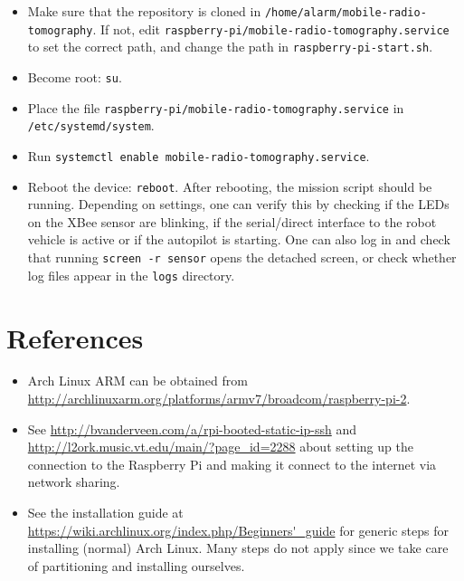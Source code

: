 \documentclass{article}
\begin{document}
\begin{itemize}
    \item Make sure that the repository is cloned in
          {\tt /home/alarm/mobile-radio-tomography}. If not, edit
          {\tt raspberry-pi/mobile-radio-tomography.service} to set the
          correct path, and change the path in {\tt raspberry-pi-start.sh}.
    \item Become root: {\tt su}.
    \item Place the file {\tt raspberry-pi/mobile-radio-tomography.service} in
          {\tt /etc/systemd/system}.
    \item Run {\tt systemctl enable mobile-radio-tomography.service}.
    \item Reboot the device: {\tt reboot}. After rebooting, the mission script 
          should be running. Depending on settings, one can verify this by 
          checking if the LEDs on the XBee sensor are blinking, if the 
          serial/direct interface to the robot vehicle is active or if the 
          autopilot is starting. One can also log in and check that running 
          {\tt screen -r sensor} opens the detached screen, or check whether 
          log files appear in the {\tt logs} directory.
\end{itemize}

\section{References}
\begin{itemize}
    \item Arch Linux ARM can be obtained from \url{http://archlinuxarm.org/platforms/armv7/broadcom/raspberry-pi-2}.
    \item See \url{http://bvanderveen.com/a/rpi-booted-static-ip-ssh} and 
          \url{http://l2ork.music.vt.edu/main/?page_id=2288} about setting up 
          the connection to the Raspberry Pi and making it connect to the 
          internet via network sharing.
    \item See the installation guide at 
          \url{https://wiki.archlinux.org/index.php/Beginners'_guide} for 
          generic steps for installing (normal) Arch Linux. Many steps do not 
          apply since we take care of partitioning and installing ourselves.
\end{itemize}
\end{document}
